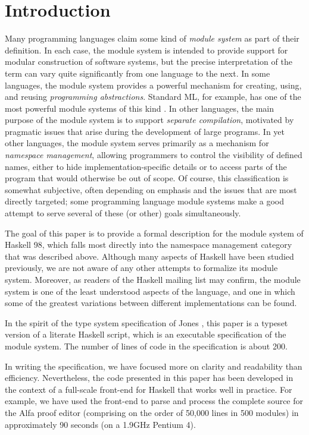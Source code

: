 \section{Introduction}
\label{intro}
Many programming languages claim some kind of {\em module system}
as part of their definition.  In each case, the module system is
intended to provide support for modular construction of software
systems, but the precise interpretation of the term can vary quite
significantly from
one language to the next.  In some languages, the module system
provides a powerful mechanism for creating, using, and reusing
{\em programming abstractions}.  Standard ML, for example,
has one of the most powerful module systems of this kind \cite{ML97}.
In other languages, the main purpose of the module system is
to support {\em separate compilation}, motivated by pragmatic
issues that arise during the development of large programs.
In yet other languages, the module system serves primarily
as a mechanism for {\em namespace management}, allowing
programmers to control the visibility of defined 
names, either to hide implementation-specific details or to
access parts of the program that would otherwise be out of scope.
Of course, this classification is somewhat subjective, often
depending on emphasis and the issues that are most directly
targeted; some programming language module systems make a good
attempt to serve several of these (or other) goals simultaneously.

The goal of this paper is to provide a formal description for
the module system of Haskell 98, which falls most directly into
the namespace management category that was described above.
Although many aspects of Haskell have been studied previously,
we are not aware of any other attempts to formalize its module
system.   Moreover, as readers of the Haskell mailing list
may confirm, the module system is one of the least understood
aspects of the language, and one in which some of the greatest
variations between different implementations can be found.

In the spirit of the type system specification of Jones \cite{thih},
this paper is a typeset version of a literate Haskell script,
which is an executable specification of the module system.
The number of lines of code in the specification is about 200.

In writing the specification, we have focused more on clarity and
readability than efficiency. Nevertheless, the code presented in this
paper has been developed in the context of a full-scale front-end for
Haskell that works well in practice. For example, we have used the
front-end to parse and process the complete source for the Alfa proof
editor \cite{hallgren:alfa-homepage}
(comprising on the order of 50,000 lines in 500 modules) in
approximately 90 seconds (on a 1.9GHz Pentium 4).


